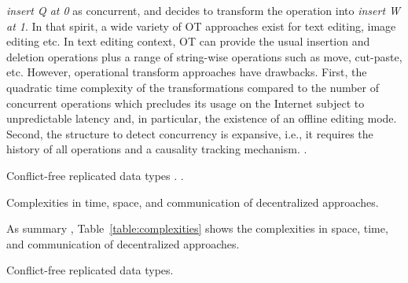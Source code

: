 \begin{asparadesc}
  \emph{insert Q at 0} as concurrent, and decides to transform the operation
  into \emph{insert W at 1}.  In that spirit, a wide variety of OT approaches
  exist for text editing, image editing etc. In text editing context, OT can
  provide the usual insertion and deletion operations plus a range of
  string-wise operations such as move, cut-paste, etc. However, operational
  transform approaches have drawbacks. First, the quadratic time complexity of
  the transformations compared to the number of concurrent operations which
  precludes its usage on the Internet subject to unpredictable latency and, in
  particular, the existence of an offline editing mode. Second, the structure to
  detect concurrency is expansive, i.e., it requires the history of all
  operations and a causality tracking mechanism. .
\item [Conflict-free replicated data types]. .

\begin{table*}
  \centering
  
  \caption{\label{table:complexities}Complexities in time, space, and communication of decentralized approaches.}
\end{table*}


\item [As summary], Table~\ref{table:complexities} shows the complexities in
  space, time, and communication of decentralized approaches. 
\end{asparadesc}

\begin{algorithm}
  
  \caption{\label{algo:crdtabsract}Conflict-free replicated data types.}
\end{algorithm}


